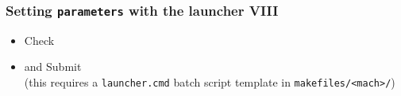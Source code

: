 \documentclass[10pt]{beamer}
\begin{document}
{
\begin{frame}[fragile]
  \frametitle{Setting {\tt parameters} with the launcher VIII}

\vspace{6.25cm}

\begin{block}{}
\begin{itemize}
\item Check
\item and Submit\\
(this requires a {\tt launcher.cmd} batch script template in \verb|makefiles/<mach>/|)
\end{itemize}
\end{block}

\end{frame}
}

\end{document}
